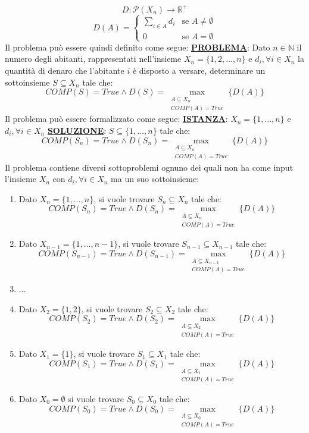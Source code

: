 \documentclass[12pt]{article}
\begin{document}
$$D: \mathcal{P}(X_n) \rightarrow \mathbb{R}^+$$
\begin{equation*}
    D(A) = \begin{cases}
        \sum_{i \in A} d_i & \textrm{se } A \neq \emptyset \\
        0 & \textrm{se } A = \emptyset
    \end{cases}
\end{equation*}
Il problema può essere quindi definito come segue: \newline
\textbf{\underline{PROBLEMA}}: Dato $n \in \mathbb{N}$ il numero degli abitanti, rappresentati nell'insieme $X_n = \{1,2,\dots,n\}$ e $d_i, \forall i \in X_n$ la quantità di denaro che l'abitante
$i$ è disposto a versare, determinare un sottoinsieme $S \subseteq X_n$ tale che:
$$COMP(S) = True \land D(S) = \max_{\substack{A \subseteq X_n \\ COMP(A) = True}}\{D(A)\}$$
Il problema può essere formalizzato come segue: \newline
\textbf{\underline{ISTANZA}}: $X_n = \{1,\dots, n\}$ e $d_i, \forall i \in X_n$ \newline
\textbf{\underline{SOLUZIONE}}: $S \subseteq \{1,\dots,n\}$ tale che:
$$COMP(S_n) = True \land D(S_n) = \max_{\substack{A \subseteq X_n \\ COMP(A) = True}}\{D(A)\}$$
Il problema contiene diversi sottoproblemi ognuno dei quali non ha come input l'insieme $X_n$ con $d_i, \forall i \in X_n$ ma un suo sottoinsieme:
\begin{enumerate}
    \item Dato $X_n = \{1,\dots, n\}$, si vuole trovare $S_n \subseteq X_n$ tale che:
    $$COMP(S_n) = True \land D(S_n) = \max_{\substack{A \subseteq X_n \\ COMP(A) = True}}\{D(A)\}$$
    \item Dato $X_{n-1}= \{1,\dots, n-1\}$, si vuole trovare $S_{n-1} \subseteq X_{n-1}$ tale che:
    $$COMP(S_{n-1}) = True \land D(S_{n-1}) = \max_{\substack{A \subseteq X_{n-1}\\ COMP(A) = True}}\{D(A)\}$$
    \item $\dots$
    \item Dato $X_2= \{1,2\}$, si vuole trovare $S_2 \subseteq X_2$ tale che:
    $$COMP(S_2) = True \land D(S_2) = \max_{\substack{A \subseteq X_2\\ COMP(A) = True}}\{D(A)\}$$
    \item Dato $X_1= \{1\}$, si vuole trovare $S_1 \subseteq X_1$ tale che:
    $$COMP(S_1) = True \land D(S_1) = \max_{\substack{A \subseteq X_1\\ COMP(A) = True}}\{D(A)\}$$
    \item Dato $X_0= \emptyset$ si vuole trovare $S_0 \subseteq X_0$ tale che:
    $$COMP(S_0) = True \land D(S_0) = \max_{\substack{A \subseteq X_0\\ COMP(A) = True}}\{D(A)\}$$
\end{enumerate}
\end{document}
